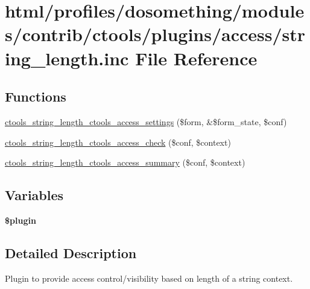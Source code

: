 \hypertarget{string__length_8inc}{
\section{html/profiles/dosomething/modules/contrib/ctools/plugins/access/string\_\-length.inc File Reference}
\label{string__length_8inc}
}
\subsection*{Functions}
\begin{DoxyCompactItemize}
\item 
\hyperlink{string__length_8inc_a5d0a61400e7705e90a8b72afd02223ae}{ctools\_\-string\_\-length\_\-ctools\_\-access\_\-settings} (\$form, \&\$form\_\-state, \$conf)
\item 
\hyperlink{string__length_8inc_a72584fd4579c83085d2935a4eb2260a6}{ctools\_\-string\_\-length\_\-ctools\_\-access\_\-check} (\$conf, \$context)
\item 
\hyperlink{string__length_8inc_ae9b9a714073650e80fc8f1529c877f4e}{ctools\_\-string\_\-length\_\-ctools\_\-access\_\-summary} (\$conf, \$context)
\end{DoxyCompactItemize}
\subsection*{Variables}
\begin{DoxyCompactItemize}
\item 
{\bfseries \$plugin}
\end{DoxyCompactItemize}


\subsection{Detailed Description}
Plugin to provide access control/visibility based on length of a string context. 

